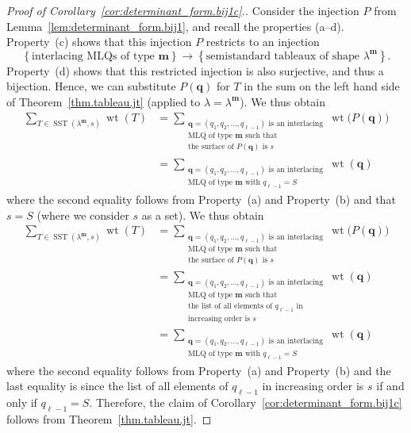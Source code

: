 \documentclass[reqno]{amsart}
\newcommand{\0}{\phantom{c}}
\DeclareMathOperator{\wt}{wt} %
\DeclareMathOperator{\SST}{SST} %
\newcommand{\mm}{\mathbf{m}}
\newcommand{\qq}{\mathbf{q}}
\let\sumnonlimits\sum
\renewcommand{\sum}{\sumnonlimits\limits}
\newenvironment{verlong}{}{}
\newenvironment{vershort}{}{}
\newcommand{\set}[1]{\left\{ #1 \right\}}
\newcommand{\tup}[1]{\left( #1 \right)}
\theoremstyle{plain}
\theoremstyle{definition}
\numberwithin{equation}{section}
\begin{document}
\begin{proof}[Proof of Corollary~\ref{cor:determinant_form.bij1c}.]
Consider the injection $P$ from Lemma~\ref{lem:determinant_form.bij1}, and recall the properties (a--d).
Property~(c) shows that this injection $P$ restricts to an injection
\[
\set{\text{interlacing MLQs of type } \mm}  \to \set{  \text{semistandard tableaux of shape } \lambda^{\mm}}.
\]
Property~(d) shows that this restricted injection is also surjective, and thus a bijection.
Hence, we can substitute $P(\qq)$ for $T$ in the sum on the left hand side of Theorem~\ref{thm.tableau.jt} (applied to $\lambda = \lambda^{\mm}$).
\begin{vershort}
We thus obtain
\begin{align*}
\sum_{T \in \SST(\lambda^{\mm}, s)} \wt(T)
  & = \sum_{\substack{\qq=\tup{q_1, q_2, \dotsc, q_{\ell-1}} \text{ is an interlacing}\\\text{MLQ of type } \mm \text{ such that} \\\text{the surface of }P(\qq) \text{ is } s}} \wt\bigl(  P(\qq) \bigr) \\
&  = \sum_{\substack{\qq = \tup{q_1,q_2,\dotsc,q_{\ell-1}} \text{ is an interlacing}\\\text{MLQ of type } \mm \text{ with } q_{\ell-1} = S}} \wt(\qq)
\end{align*}
where the second equality follows from Property~(a) and Property~(b) and that $s = S$ (where we consider $s$ as a set).
\end{vershort}
\begin{verlong}
We thus obtain
\begin{align*}
\sum_{T \in \SST(\lambda^{\mm}, s)} \wt(T)
  & = \sum_{\substack{\qq=\tup{q_1, q_2, \dotsc, q_{\ell-1}} \text{ is an interlacing}\\\text{MLQ of type } \mm \text{ such that} \\\text{the surface of }P(\qq) \text{ is } s}} \wt\bigl(  P(\qq) \bigr) \\
&  = \sum_{\substack{\qq= \tup{q_1, q_2, \dotsc,q_{\ell-1}} \text{ is an interlacing}\\\text{MLQ of type } \mm \text{ such that}\\\text{the list of all elements of } q_{\ell-1} \text{ in} \\\text{increasing order is } s}} \wt(\qq) \\
&  = \sum_{\substack{\qq = \tup{q_1,q_2,\dotsc,q_{\ell-1}} \text{ is an interlacing}\\\text{MLQ of type } \mm \text{ with } q_{\ell-1} = S}} \wt(\qq)
\end{align*}
where the second equality follows from Property~(a) and Property~(b) and the last equality is since the list of all elements of $q_{\ell-1}$ in increasing order is $s$ if and only if $q_{\ell-1}=S$.
\end{verlong}
Therefore, the claim of Corollary~\ref{cor:determinant_form.bij1c} follows from Theorem~\ref{thm.tableau.jt}.
\end{proof}
\end{document}

